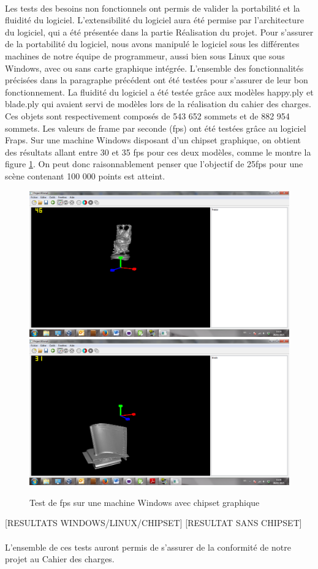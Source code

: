 \paragraph{}
Les tests des besoins non fonctionnels ont permis de valider la portabilité et la fluidité du logiciel. L'extensibilité du logiciel aura été permise par l'architecture du logiciel, qui a été présentée dans la partie Réalisation du projet.
Pour s'assurer de la portabilité du logiciel, nous avons manipulé le logiciel sous les différentes machines de notre équipe de programmeur, aussi bien sous Linux que sous Windows, avec ou sans carte graphique intégrée. L'ensemble des fonctionnalités précisées dans la paragraphe précédent ont été testées pour s'assurer de leur bon fonctionnement.
La fluidité du logiciel a été testée grâce aux modèles happy.ply et blade.ply qui avaient servi de modèles lors de la réalisation du cahier des charges. Ces objets sont respectivement composés de 543 652 sommets et de 882 954 sommets. Les valeurs de frame par seconde (fps) ont été testées grâce au logiciel Fraps\footnotemark.
Sur une machine Windows disposant d'un chipset graphique, on obtient des résultats allant entre 30 et 35 fps pour ces deux modèles, comme le montre la figure \ref{fig:fps_windows_chipset}. On peut donc raisonnablement penser que l'objectif de 25fps pour une scène contenant 100 000 points est atteint.


\begin{figure}[h]
	\centering
	\includegraphics[scale=0.3]{happy_fps.png}
        \includegraphics[scale=0.3]{blade_fps.png}
       	\caption{\label{fig:fps_windows_chipset} Test de fps sur une machine Windows avec chipset graphique\protect}
\end{figure}
[RESULTATS WINDOWS/LINUX/CHIPSET]
[RESULTAT SANS CHIPSET]

\paragraph{}
L'ensemble de ces tests auront permis de s'assurer de la conformité de notre projet au Cahier des charges. 
